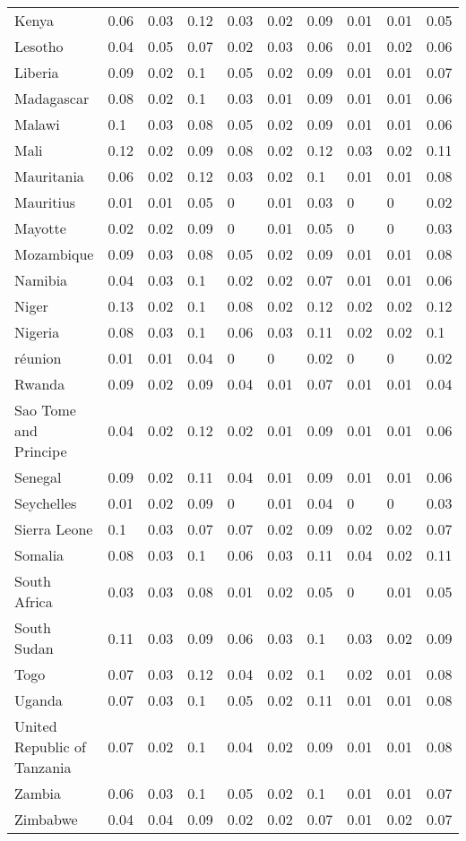 \begin{longtable}[t]{llllllllll}
Kenya & 0.06 & 0.03 & 0.12 & 0.03 & 0.02 & 0.09 & 0.01 & 0.01 & 0.05\\
Lesotho & 0.04 & 0.05 & 0.07 & 0.02 & 0.03 & 0.06 & 0.01 & 0.02 & 0.06\\
Liberia & 0.09 & 0.02 & 0.1 & 0.05 & 0.02 & 0.09 & 0.01 & 0.01 & 0.07\\
Madagascar & 0.08 & 0.02 & 0.1 & 0.03 & 0.01 & 0.09 & 0.01 & 0.01 & 0.06\\
Malawi & 0.1 & 0.03 & 0.08 & 0.05 & 0.02 & 0.09 & 0.01 & 0.01 & 0.06\\
Mali & 0.12 & 0.02 & 0.09 & 0.08 & 0.02 & 0.12 & 0.03 & 0.02 & 0.11\\
Mauritania & 0.06 & 0.02 & 0.12 & 0.03 & 0.02 & 0.1 & 0.01 & 0.01 & 0.08\\
Mauritius & 0.01 & 0.01 & 0.05 & 0 & 0.01 & 0.03 & 0 & 0 & 0.02\\
Mayotte & 0.02 & 0.02 & 0.09 & 0 & 0.01 & 0.05 & 0 & 0 & 0.03\\
Mozambique & 0.09 & 0.03 & 0.08 & 0.05 & 0.02 & 0.09 & 0.01 & 0.01 & 0.08\\
Namibia & 0.04 & 0.03 & 0.1 & 0.02 & 0.02 & 0.07 & 0.01 & 0.01 & 0.06\\
Niger & 0.13 & 0.02 & 0.1 & 0.08 & 0.02 & 0.12 & 0.02 & 0.02 & 0.12\\
Nigeria & 0.08 & 0.03 & 0.1 & 0.06 & 0.03 & 0.11 & 0.02 & 0.02 & 0.1\\
réunion & 0.01 & 0.01 & 0.04 & 0 & 0 & 0.02 & 0 & 0 & 0.02\\
Rwanda & 0.09 & 0.02 & 0.09 & 0.04 & 0.01 & 0.07 & 0.01 & 0.01 & 0.04\\
Sao Tome and Principe & 0.04 & 0.02 & 0.12 & 0.02 & 0.01 & 0.09 & 0.01 & 0.01 & 0.06\\
Senegal & 0.09 & 0.02 & 0.11 & 0.04 & 0.01 & 0.09 & 0.01 & 0.01 & 0.06\\
Seychelles & 0.01 & 0.02 & 0.09 & 0 & 0.01 & 0.04 & 0 & 0 & 0.03\\
Sierra Leone & 0.1 & 0.03 & 0.07 & 0.07 & 0.02 & 0.09 & 0.02 & 0.02 & 0.07\\
Somalia & 0.08 & 0.03 & 0.1 & 0.06 & 0.03 & 0.11 & 0.04 & 0.02 & 0.11\\
South Africa & 0.03 & 0.03 & 0.08 & 0.01 & 0.02 & 0.05 & 0 & 0.01 & 0.05\\
South Sudan & 0.11 & 0.03 & 0.09 & 0.06 & 0.03 & 0.1 & 0.03 & 0.02 & 0.09\\
Togo & 0.07 & 0.03 & 0.12 & 0.04 & 0.02 & 0.1 & 0.02 & 0.01 & 0.08\\
Uganda & 0.07 & 0.03 & 0.1 & 0.05 & 0.02 & 0.11 & 0.01 & 0.01 & 0.08\\
United Republic of Tanzania & 0.07 & 0.02 & 0.1 & 0.04 & 0.02 & 0.09 & 0.01 & 0.01 & 0.08\\
Zambia & 0.06 & 0.03 & 0.1 & 0.05 & 0.02 & 0.1 & 0.01 & 0.01 & 0.07\\
Zimbabwe & 0.04 & 0.04 & 0.09 & 0.02 & 0.02 & 0.07 & 0.01 & 0.02 & 0.07\\*
\end{longtable}
\endgroup{}
